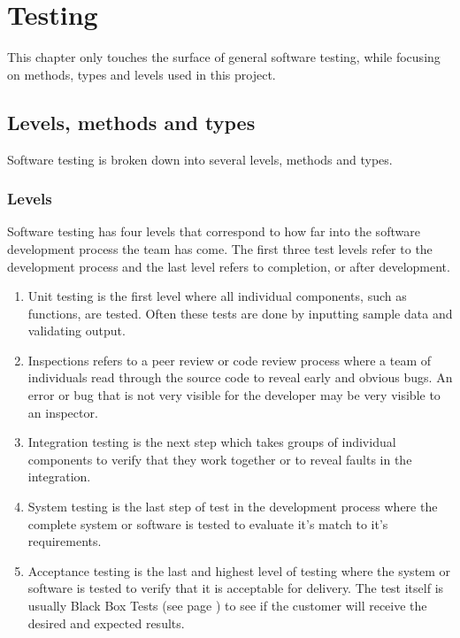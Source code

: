 \chapter{Testing}
This chapter only touches the surface of general software testing, while focusing on methods, types and levels used in this project.
\section{Levels, methods and types}
Software testing is broken down into several levels, methods and types.
\subsection{Levels}
Software testing has four levels that correspond to how far into the software development process the team has come. The first three test levels refer to the development process and the last level refers to completion, or after development.
\begin{enumerate}
\item Unit testing is the first level where all individual components, such as functions, are tested. Often these tests are done by inputting sample data and validating output.
\item Inspections refers to a peer review or code review process where a team of individuals read through the source code to reveal early and obvious bugs. An error or bug that is not very visible for the developer may be very visible to an inspector.
\item Integration testing is the next step which takes groups of individual components to verify that they work together or to reveal faults in the integration.
\item System testing is the last step of test in the development process where the complete system or software is tested to evaluate it's match to it's requirements.
\item Acceptance testing is the last and highest level of testing where the system or software is tested to verify that it is acceptable for delivery. The test itself is usually Black Box Tests (see page \pageref{def:blackboxtesting}) to see if the customer will receive the desired and expected results.
\end{enumerate}

